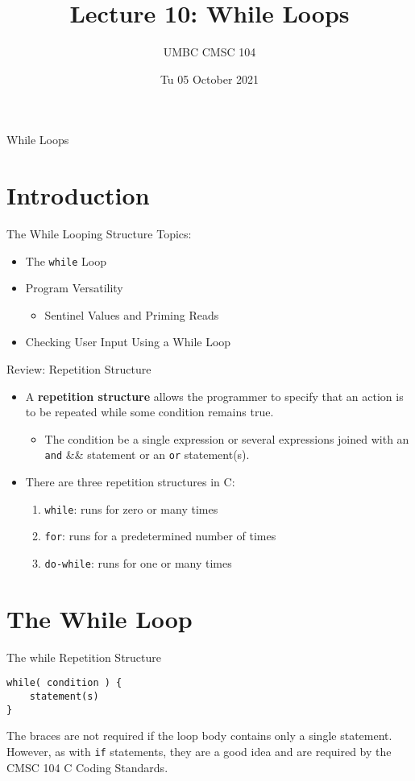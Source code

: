 \documentclass[graphics]{beamer}
\title{Lecture 10: While Loops}
\author{UMBC CMSC 104}
\date{Tu 05 October 2021}
\begin{document}
\begin{frame}{}
\centering
    While Loops
\end{frame}

\section*{Introduction}
\begin{frame}{The While Looping Structure}
    Topics:
    \begin{itemize}
        \item The \texttt{while} Loop
        \item Program Versatility
        \begin{itemize}
            \item Sentinel Values and Priming Reads
        \end{itemize}
        \item Checking User Input Using a While Loop
    \end{itemize}
\end{frame}

\begin{frame}{Review: Repetition Structure}
    \begin{itemize}
        \item A \textbf{repetition structure} allows the programmer to specify that an action is to be repeated while some condition remains true.
        \begin{itemize}
            \item The condition be a single expression or several expressions joined with an \texttt{and} \&\& statement or an \texttt{or} \textbar\textbar statement(s). 
        \end{itemize}
        \item There are three repetition structures in C:
        \begin{enumerate}
            \item \texttt{while}: runs for zero or many times
            \item \texttt{for}: runs for a predetermined number of times
            \item \texttt{do-while}: runs for one or many times
        \end{enumerate}
    \end{itemize}
\end{frame}

\section*{The While Loop}
\begin{frame}[fragile]{The while Repetition Structure}
\begin{verbatim}
while( condition ) {
    statement(s)
}
\end{verbatim}
The braces are not required if the loop body contains only a single statement. However, as with \texttt{if} statements, they are a good idea and are required by the CMSC 104 C Coding Standards.
\end{frame}
\end{document}
